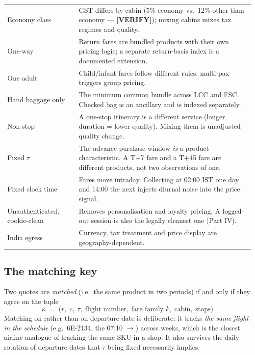 \begin{center}
\small
\begin{tabularx}{\textwidth}{@{}L{3.4cm} X@{}}
\toprule
{} &  \\
\midrule
Economy class & GST differs by cabin (5\% economy vs.\ 12\% other than economy --- \textbf{[VERIFY]}); mixing cabins mixes tax regimes and quality. \\
One-way & Return fares are bundled products with their own pricing logic; a separate return-basis index is a documented extension. \\
One adult & Child/infant fares follow different rules; multi-pax triggers group pricing. \\
Hand baggage only & The minimum common bundle across LCC and FSC. Checked bag is an ancillary and is indexed separately. \\
Non-stop & A one-stop itinerary is a different service (longer duration = lower quality). Mixing them is unadjusted quality change. \\
Fixed $\tau$ & The advance-purchase window \emph{is} a product characteristic. A T$+$7 fare and a T$+$45 fare are different products, not two observations of one. \\
Fixed clock time & Fares move intraday. Collecting at 02:00 IST one day and 14:00 the next injects diurnal noise into the price signal. \\
Unauthenticated, cookie-clean & Removes personalisation and loyalty pricing. A logged-out session is also the legally cleanest one (Part IV). \\
India egress & Currency, tax treatment and price display are geography-dependent. \\
\bottomrule
\end{tabularx}
\end{center}

\subsection{The matching key}

Two quotes are \emph{matched} (i.e.\ the same product in two periods) if and only if they
agree on the tuple
\begin{equation}
\kappa \;=\; \big(r,\; c,\; \tau,\; \text{flight\_number},\; \text{fare\_family } k,\; \text{cabin},\; \text{stops}\big)
\end{equation}
Matching on  rather than on departure date is deliberate: it tracks
\emph{the same flight in the schedule} (e.g.\ 6E-2134, the 07:10 $\to$)
across weeks, which is the closest airline analogue of tracking the same SKU in a shop. It
also survives the daily rotation of departure dates that $\tau$ being fixed necessarily
implies.

